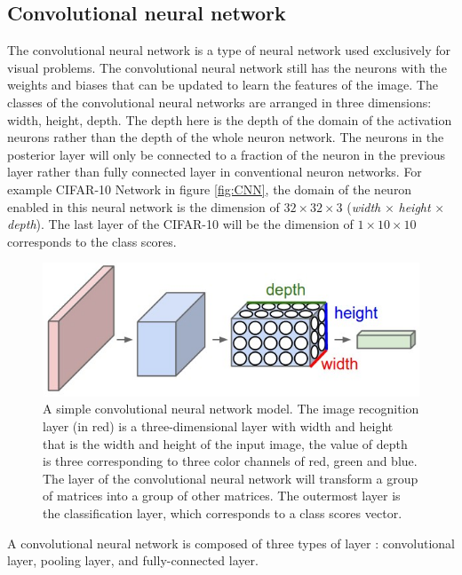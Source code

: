 \documentclass[conference]{IEEEtran}
\begin{document}
\subsection{Convolutional neural network}
The convolutional neural network \cite{CNN:2020:Standford} is a type of neural network used exclusively for visual problems. The convolutional neural network still has the neurons with the weights and biases that can be updated to learn the features of the image. The classes of the convolutional neural networks are arranged in three dimensions: width, height, depth. The depth here is the depth of the domain of the activation neurons rather than the depth of the whole neuron network. The neurons in the posterior layer will only be connected to a fraction of the neuron in the previous layer rather than fully connected layer in conventional neuron networks. For example CIFAR-10 Network in figure \ref{fig:CNN}, the domain of the neuron enabled in this neural network is the dimension of $32 {\times}32{\times}3 $ (\emph{width} $ {\times} $ \emph{height} $ {\times} $ \emph{depth}). The last layer of the CIFAR-10 will be the dimension of $1{\times}10{\times}10 $ corresponds to the class scores.
\begin{figure}[ht]
	\centerline{\includegraphics[scale=0.3]{images/cnn.jpeg}}
  	\caption{A simple convolutional neural network model. The image recognition layer (in red) is a three-dimensional layer with width and height that is the width and height of the input image, the value of depth is three corresponding to three color channels of red, green and blue. The layer of the convolutional neural network will transform a group of matrices into a group of other matrices. The outermost layer is the classification layer, which corresponds to a class scores vector.}
  	\label{fig:cnn}
\end{figure}
A convolutional neural network is composed of three types of layer \cite[p.113:123]{tuan:2019}: convolutional layer, pooling layer, and fully-connected layer.
\end{document}
